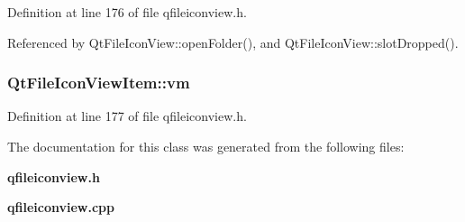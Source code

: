 Definition at line 176 of file qfileiconview.h.

Referenced by Qt\-File\-Icon\-View::open\-Folder(), and Qt\-File\-Icon\-View::slot\-Dropped().
\subsubsection{ {\bf Qt\-File\-Icon\-View\-Item::vm}\hspace{0.3cm}{\tt  [protected]}}\label{classQtFileIconViewItem_QtFileIconViewItemp5}




Definition at line 177 of file qfileiconview.h.

The documentation for this class was generated from the following files:\begin{CompactItemize}
\item 
{\bf qfileiconview.h}\item 
{\bf qfileiconview.cpp}\end{CompactItemize}
